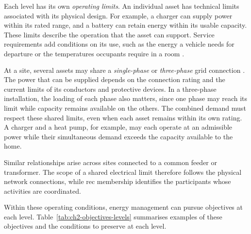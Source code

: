 Each level has its own \emph{operating limits}. An individual asset has technical limits associated with its physical design. For example, a charger can supply power within its rated range, and a battery can retain energy within its usable capacity. These limits describe the operation that the asset can support. Service requirements add conditions on its use, such as the energy a vehicle needs for departure or the temperatures occupants require in a room \parencite{hussain2023flexibility}.

At a site, several assets may share a \emph{single-phase} or \emph{three-phase} grid connection \parencite{eredes2025connectionmanual}. The power that can be supplied depends on the connection rating and the current limits of its conductors and protective devices. In a three-phase installation, the loading of each phase also matters, since one phase may reach its limit while capacity remains available on the others. The combined demand must respect these shared limits, even when each asset remains within its own rating. A charger and a heat pump, for example, may each operate at an admissible power while their simultaneous demand exceeds the capacity available to the home.

Similar relationships arise across sites connected to a common feeder or transformer. The scope of a shared electrical limit therefore follows the physical network connections, while \gls{rec} membership identifies the participants whose activities are coordinated.

Within these operating conditions, energy management can pursue objectives at each level. Table~\ref{tab:ch2-objectives-levels} summarises examples of these objectives and the conditions to preserve at each level.

